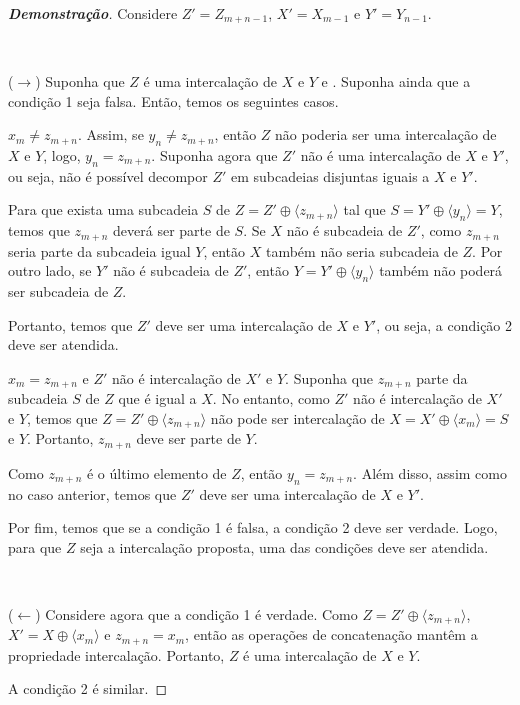 \begin{proof}[\textbf{Demonstração}]
    Considere $Z' = Z_{m + n - 1}$, $X' = X_{m - 1}$ e $Y' = Y_{n - 1}$.

    ~

    ($\rightarrow$) Suponha que $Z$ é uma intercalação de $X$ e $Y$ e . Suponha ainda que a condição 1 seja falsa. Então, temos os seguintes casos.

    \begin{casos}
        \item $x_m \ne z_{m + n}$. Assim, se $y_n \ne z_{m + n}$, então $Z$ não poderia ser uma intercalação de $X$ e $Y$, logo, $y_n = z_{m + n}$. Suponha agora que $Z'$ não é uma intercalação de $X$ e $Y'$, ou seja, não é possível decompor $Z'$ em subcadeias disjuntas iguais a $X$ e $Y'$.

        Para que exista uma subcadeia $S$ de $Z = Z' \oplus \langle z_{m + n} \rangle$ tal que $S = Y' \oplus \langle y_n \rangle = Y$, temos que $z_{m + n}$ deverá ser parte de $S$. Se $X$ não é subcadeia de $Z'$, como $z_{m + n}$ seria parte da subcadeia igual $Y$, então $X$ também não seria subcadeia de $Z$. Por outro lado, se $Y'$ não é subcadeia de $Z'$, então $Y = Y' \oplus \langle y_n \rangle$ também não poderá ser subcadeia de $Z$.

        Portanto, temos que $Z'$ deve ser uma intercalação de $X$ e $Y'$, ou seja, a condição 2 deve ser atendida.

        \item $x_m = z_{m + n}$ e $Z'$ não é intercalação de $X'$ e $Y$. Suponha que $z_{m + n}$ parte da subcadeia $S$ de $Z$ que é igual a $X$. No entanto, como $Z'$ não é intercalação de $X'$ e $Y$, temos que $Z = Z' \oplus \langle z_{m + n} \rangle$ não pode ser intercalação de $X = X' \oplus \langle x_m \rangle = S$ e $Y$. Portanto, $z_{m + n}$ deve ser parte de $Y$.

        Como $z_{m + n}$ é o último elemento de $Z$, então $y_n = z_{m + n}$. Além disso, assim como no caso anterior, temos que $Z'$ deve ser uma intercalação de $X$ e $Y'$.
    \end{casos}

    Por fim, temos que se a condição 1 é falsa, a condição 2 deve ser verdade. Logo, para que $Z$ seja a intercalação proposta, uma das condições deve ser atendida.

    ~

    ($\leftarrow$) Considere agora que a condição 1 é verdade. Como $Z = Z' \oplus \langle z_{m + n} \rangle$, $X' = X \oplus \langle x_m \rangle$ e $z_{m + n} = x_m$, então as operações de concatenação mantêm a propriedade intercalação. Portanto, $Z$ é uma intercalação de $X$ e $Y$.

    A condição 2 é similar.
\end{proof}


